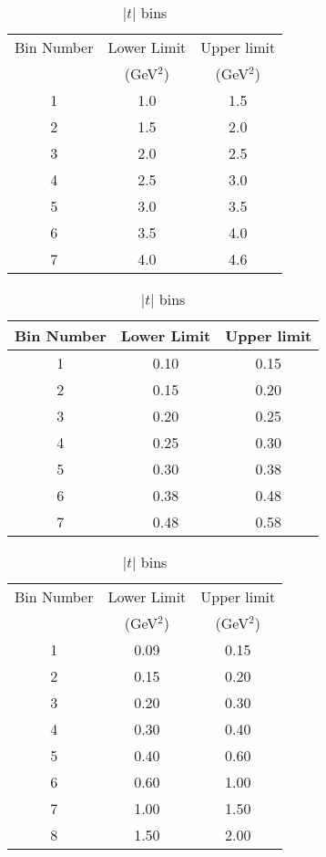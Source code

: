 \documentclass[prc,aps,floatfix,showpacs,showkeys,twocolumn,superscriptaddress,letterpaper,10pt]{revtex4-1}
\begin{document}
\begingroup
\squeezetable
\begin{table}
\caption{$Q^2$ bins}
\begin{ruledtabular}
\begin{tabular}{ccc}
Bin Number & Lower Limit & Upper limit \\ 
 & (GeV$^2$)   & (GeV$^2$) \\ \hline
1 & 1.0   &  1.5 \\ 
2 & 1.5   &  2.0 \\   
3 & 2.0   &  2.5 \\
4 & 2.5   &  3.0 \\ 
5 & 3.0   &  3.5 \\ 
6 & 3.5   &  4.0 \\  
7 & 4.0   &  4.6 \\
\end{tabular}
\label{q2-bins}
\end{ruledtabular}



\caption{$x_B$ bins}
\begin{ruledtabular}
\begin{tabular}{ccc}
Bin Number & Lower Limit & Upper limit \\ \hline
1 & 0.10   &  0.15 \\
2 & 0.15   &  0.20 \\  
3 & 0.20   &  0.25 \\
4 & 0.25   &  0.30 \\ 
5 & 0.30   &  0.38 \\
6 & 0.38   &  0.48 \\  
7 & 0.48   &  0.58 \\ 
\end{tabular}
\end{ruledtabular}
\label{x-bins}


\caption{$|t|$ bins}
\begin{ruledtabular}
\begin{tabular}{ccc}
Bin Number & Lower Limit & Upper limit \\ 
           & (GeV$^2$)   & (GeV$^2$) \\ \hline

1 & 0.09   &  0.15 \\ 
2 & 0.15   &  0.20 \\   
3 & 0.20   &  0.30 \\ 
4 & 0.30   &  0.40 \\
5 & 0.40   &  0.60 \\
6 & 0.60   &  1.00 \\ 
7 & 1.00   &  1.50 \\
8 & 1.50   &  2.00 \\
\end{tabular}
\end{ruledtabular}
\label{t-bins}
\end{table}
\endgroup
\end{document}
